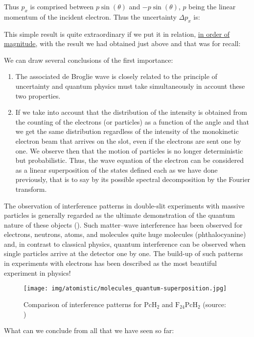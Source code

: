 	Thus $p_x$ is comprised between $p\sin(\theta)$ and $-p\sin(\theta)$, $p$ being the linear momentum of the incident electron. Thus the uncertainty $\Delta p_x$ is:
	
	This simple result is quite extraordinary if we put it in relation, \underline{in order of magnitude}, with the result we had obtained just above and that was for recall:
	
	We can draw several conclusions of the first importance:
	\begin{enumerate}
		\item The associated de Broglie wave  is closely related to the principle of uncertainty and quantum physics must take simultaneously in account these two properties.

		\item If we take into account that the distribution of the intensity is obtained from the counting of the electrons (or particles) as a function of the angle and that we get the same distribution regardless of the intensity of the monokinetic electron beam that arrives on the slot, even if the electrons are sent one by one. We observe then that the motion of particles is no longer deterministic but probabilistic. Thus, the wave equation of the electron can be considered as a linear superposition of the states defined each as we have done previously, that is to say by its possible spectral decomposition by the Fourier transform.
	\end{enumerate}
	The observation of interference patterns in double-slit experiments with massive particles is generally regarded as the ultimate demonstration of the quantum nature of these objects (). Such matter–wave interference has been observed for electrons, neutrons, atoms, and molecules quite huge molecules (phthalocyanine) and, in contrast to classical physics, quantum interference can be observed when single particles arrive at the detector one by one. The build-up of such patterns in experiments with electrons has been described as the most beautiful experiment in physics!
	\begin{figure}[H]
		\centering
		\texttt{[image: img/atomistic/molecules\_quantum-superposition.jpg]}
		\caption[Comparison of interference patterns]{Comparison of interference patterns for $\mathrm{PcH}_2$ and $\mathrm{F}_{24}\mathrm{PcH}_2$ (source: \cite{juffmann2012real})}
	\end{figure}
	What can we conclude from all that we have seen so far:
